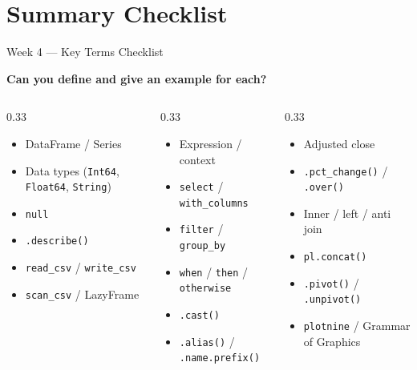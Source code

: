 \documentclass[9pt,aspectratio=169]{beamer}
\begin{document}
\section{Summary Checklist}

\begin{frame}{Week 4 --- Key Terms Checklist}

\textbf{Can you define and give an example for each?}

\medskip

\begin{columns}[T]
\begin{column}{0.33\textwidth}
\begin{itemize}
    \item DataFrame / Series
    \item Data types (\texttt{Int64}, \texttt{Float64}, \texttt{String})
    \item \texttt{null}
    \item \texttt{.describe()}
    \item \texttt{read\_csv} / \texttt{write\_csv}
    \item \texttt{scan\_csv} / LazyFrame
\end{itemize}
\end{column}
\begin{column}{0.33\textwidth}
\begin{itemize}
    \item Expression / context
    \item \texttt{select} / \texttt{with\_columns}
    \item \texttt{filter} / \texttt{group\_by}
    \item \texttt{when} / \texttt{then} / \texttt{otherwise}
    \item \texttt{.cast()}
    \item \texttt{.alias()} / \texttt{.name.prefix()}
\end{itemize}
\end{column}
\begin{column}{0.33\textwidth}
\begin{itemize}
    \item Adjusted close
    \item \texttt{.pct\_change()} / \texttt{.over()}
    \item Inner / left / anti join
    \item \texttt{pl.concat()}
    \item \texttt{.pivot()} / \texttt{.unpivot()}
    \item \texttt{plotnine} / Grammar of Graphics
\end{itemize}
\end{column}
\end{columns}

\end{frame}
\end{document}
